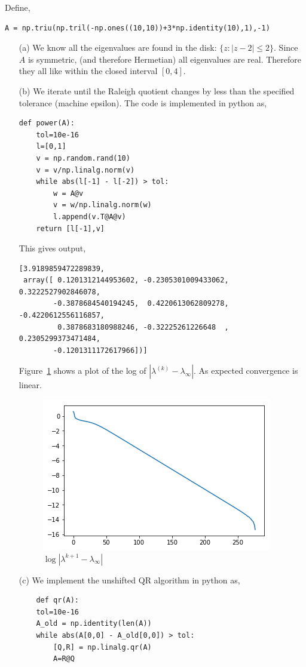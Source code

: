 \documentclass[10pt]{article}
\begin{document}
\begin{solution}[Solution]
Define,
\begin{lstlisting}
A = np.triu(np.tril(-np.ones((10,10))+3*np.identity(10),1),-1)
\end{lstlisting}

\begin{enumerate}
    \item[(a)] We know all the eigenvalues are found in the disk: \( \{z : |z-2| \leq 2 \} \). Since \( A \) is symmetric, (and therefore Hermetian) all eigenvalues are real. Therefore they all like within the closed interval \( [0,4] \).
    \item[(b)]
        We iterate until the Raleigh quotient changes by less than the specified tolerance (machine epsilon). The code is implemented in python as,
        \begin{lstlisting}
def power(A):
    tol=10e-16
    l=[0,1]
    v = np.random.rand(10)
    v = v/np.linalg.norm(v)
    while abs(l[-1] - l[-2]) > tol:
        w = A@v
        v = w/np.linalg.norm(w)
        l.append(v.T@A@v)
    return [l[-1],v]
        \end{lstlisting}
        This gives output,
        \begin{lstlisting}
[3.9189859472289839,
 array([ 0.1201312144953602, -0.2305301009433062,  0.3222527902846078,
        -0.3878684540194245,  0.4220613062809278, -0.4220612556116857,
         0.3878683180988246, -0.32225261226648  ,  0.2305299373471484,
        -0.1201311172617966])]
        \end{lstlisting}

        Figure~\ref{powercg} shows a  plot of the log of \( |\lambda^{(k)} - \lambda_\infty| \). As expected convergence is linear.
        \begin{figure}[H]\centering
            \includegraphics[width=.5\textwidth]{img/powercg.png}
            \caption{\(\log|\lambda^{k+1} - \lambda_\infty|\) }
            \label{powercg}
        \end{figure}
        
    
    \item[(c)]
        We implement the unshifted QR algorithm in python as,
\begin{lstlisting}
    def qr(A):
    tol=10e-16
    A_old = np.identity(len(A))
    while abs(A[0,0] - A_old[0,0]) > tol:
        [Q,R] = np.linalg.qr(A)
        A=R@Q
    

\end{lstlisting}
\end{enumerate}
\end{solution}
\end{document}
